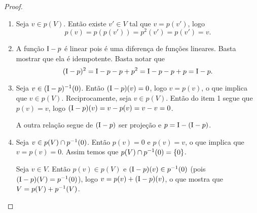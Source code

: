 \begin{proof}
	\begin{enumerate}	
	\item Seja $v \in p(V)$. Então existe $v' \in V$ tal que $v=p(v')$, logo
		\begin{equation*}
		p(v) = p(p(v')) = p^2(v') = p(v') = v.
		\end{equation*}
	
	\item A função $\mathrm{I}-p$ é linear pois é uma diferença de funções lineares. Basta mostrar que ela é idempotente. Basta notar que%
		\begin{equation*}
		(\mathrm{I}-p)^2 = \mathrm{I}-p-p+p^2 = \mathrm{I}-p-p+p = \mathrm{I}-p.
		\end{equation*}
	
	\item Seja $v \in (\mathrm{I}-p)^{-1}(0)$. Então $(\mathrm{I}-p)(v)=0$, logo $v=p(v)$, o que implica que $v \in p(V)$. Reciprocamente, seja $v \in p(V)$. Então do item 1 segue que $p(v) = v$, logo $(\mathrm{I}-p)(v) = v-p(v) = v-v = 0$.

A outra relação segue de $(\mathrm{I}-p)$ ser projeção e $p = \mathrm{I} - (\mathrm{I}-p)$.

	\item Seja $v \in p(V) \cap p^{-1}(0)$. Então $p(v)=0$ e $p(v)=v$, o que implica que $v = p(v) = 0$. Assim temos que $p(V) \cap p^{-1}(0) = \{0\}$.
	
	Seja $v \in V$. Então $p(v) \in p(V)$ e $(\mathrm{I}-p)(v) \in p^{-1}(0)$ (pois $(\mathrm{I}-p)(V) = p^{-1}(0)$), logo $v = p(v) + (\mathrm{I}-p)(v)$, o que mostra que $V = p(V) + p^{-1}(V)$.
	

\end{enumerate}
\end{proof}
